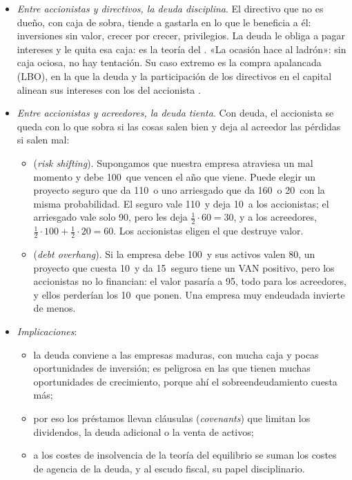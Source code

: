 \documentclass[11pt]{article}
\begin{document}
\begin{itemize}
\item \emph{Entre accionistas y directivos, la deuda disciplina}. El directivo que no es dueño, con caja de sobra, tiende a gastarla en lo que le beneficia a él: inversiones sin valor, crecer por crecer, privilegios. La deuda le obliga a pagar intereses y le quita esa caja: es la teoría del \nocite{Jensen1986Agency}. «La ocasión hace al ladrón»: sin caja ociosa, no hay tentación. Su caso extremo es la compra apalancada (LBO), en la que la deuda y la participación de los directivos en el capital alinean sus intereses con los del accionista .
\item \emph{Entre accionistas y acreedores, la deuda tienta}. Con deuda, el accionista se queda con lo que sobra si las cosas salen bien y deja al acreedor las pérdidas si salen mal:
  \begin{itemize}
  \item {} (\emph{risk shifting})\nocite{JensenMeckling1976Theory}. Supongamos que nuestra empresa atraviesa un mal momento y debe 100~que vencen el año que viene. Puede elegir un proyecto seguro que da 110~o uno arriesgado que da 160~o 20~con la misma probabilidad. El seguro vale 110~y deja 10~a los accionistas; el arriesgado vale solo 90, pero les deja $\tfrac12\cdot60=30$, y a los acreedores, $\tfrac12\cdot100+\tfrac12\cdot20=60$. Los accionistas eligen el que destruye valor.
  \item {} (\emph{debt overhang})\nocite{Myers1977Determinants}. Si la empresa debe 100~y sus activos valen 80, un proyecto que cuesta 10~y da 15~seguro tiene un VAN positivo, pero los accionistas no lo financian: el valor pasaría a 95, todo para los acreedores, y ellos perderían los 10~que ponen. Una empresa muy endeudada invierte de menos.
  \end{itemize}
\item \emph{Implicaciones}:
  \begin{itemize}
  \item la deuda conviene a las empresas maduras, con mucha caja y pocas oportunidades de inversión; es peligrosa en las que tienen muchas oportunidades de crecimiento, porque ahí el sobreendeudamiento cuesta más;
  \item por eso los préstamos llevan cláusulas (\emph{covenants}) que limitan los dividendos, la deuda adicional o la venta de activos;
  \item a los costes de insolvencia de la teoría del equilibrio se suman los costes de agencia de la deuda, y al escudo fiscal, su papel disciplinario.
  \end{itemize}
\end{itemize}
\end{document}

